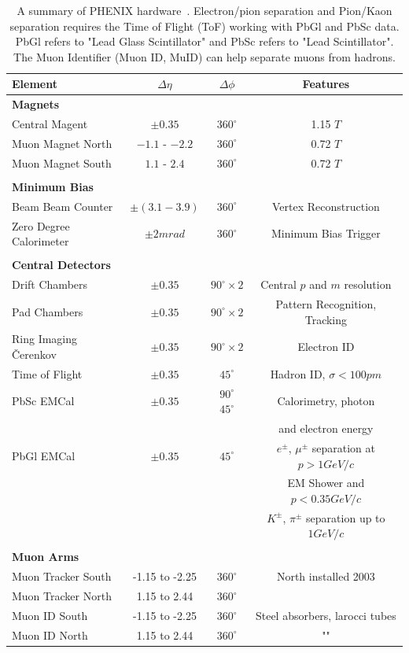 \begin{table}
  \centering
  \begin{tabular}{lccc}
    \toprule
    \textbf{Element}	& \textbf{$\Delta\eta$}	& \textbf{$\Delta\phi$} & \textbf{Features} \\
    \midrule
    \textbf{Magnets} & & & \\
    Central Magent & $\pm 0.35$ & $360^{\circ}$ & 1.15 $T$ \\ 
    Muon Magnet North & $-1.1$ - $-2.2$ & $360^{\circ}$ & 0.72 $T$ \\
    Muon Magnet South & $1.1$ - $2.4$ & $360^{\circ}$ & 0.72 $T$ \\
    & & & \\
    \textbf{Minimum Bias} & & & \\
    Beam Beam Counter & $\pm(3.1-3.9)$ & $360^{\circ}$ & Vertex Reconstruction \\
    Zero Degree Calorimeter & $\pm 2 mrad$ & $360^{\circ}$ & Minimum Bias Trigger \\
    & & & \\
    \textbf{Central Detectors} & & & \\
    Drift Chambers & $\pm0.35$ & $90^{\circ}\times2$ & Central $p$ and $m$ resolution \\
    Pad Chambers & $\pm0.35$ & $90^{\circ}\times2$ & Pattern Recognition, Tracking \\
    Ring Imaging \v{C}erenkov & $\pm0.35$ & $90^{\circ}\times2$ & Electron ID \\
    Time of Flight & $\pm0.35$ & $45^{\circ}$ & Hadron ID, $\sigma<100pm$ \\
    PbSc EMCal & $\pm0.35$ & $90^{\circ}$ $45^{\circ}$ & Calorimetry, photon \\
    & & & and electron energy \\
    PbGl EMCal & $\pm0.35$ & $45^{\circ}$ & $e^{\pm}$, $\mu^{\pm}$ separation at $p> 1 GeV/c$ \\
    & & & EM Shower and $p < 0.35 GeV/c$ \\
    & & & $K^{\pm}$, $\pi^{\pm}$ separation up to $1 GeV/c$ \\
    & & & \\
    \textbf{Muon Arms} & & & \\
    Muon Tracker South & -1.15 to -2.25 & $360^{\circ}$ & North installed 2003 \\
    Muon Tracker North & 1.15 to 2.44   & $360^{\circ}$ &  \\
    Muon ID South & -1.15 to -2.25 & $360^{\circ}$ & Steel absorbers, larocci
    tubes \\
    Muon ID North & 1.15 to 2.44   & $360^{\circ}$ & "" \\
    \bottomrule 
  \end{tabular}
  \caption{
    A summary of PHENIX hardware~\cite{Adcox2003}. Electron/pion separation and
    Pion/Kaon separation requires the Time of Flight (ToF) working with PbGl and
    PbSc data. PbGl refers to "Lead Glass Scintillator" and PbSc refers to "Lead
    Scintillator". The Muon Identifier (Muon ID, MuID) can help separate muons
    from hadrons. 
  }
  \label{tab:phenix_detector_summary}
\end{table}

